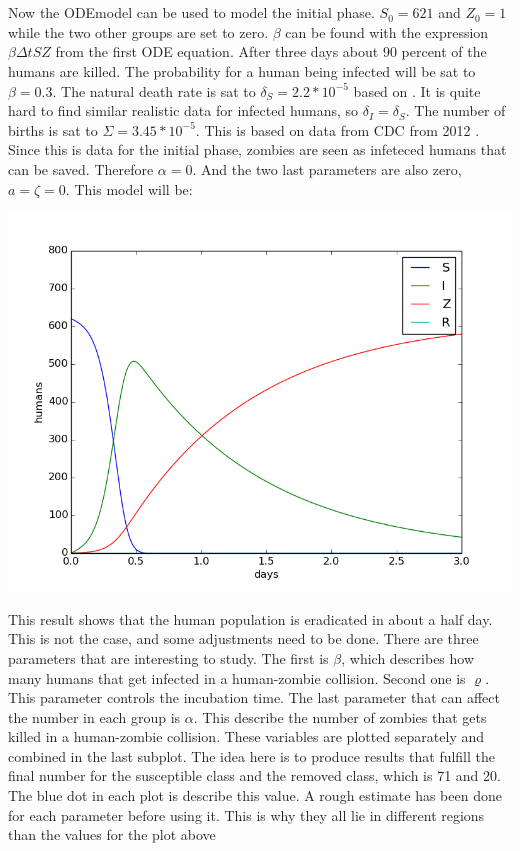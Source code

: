 \documentclass[%
twoside,                 %
final,                   %
10pt]{article}
\begin{document}
\\
\\
Now the ODEmodel can be used to model the initial phase. $S_0 = 621$ and $Z_0 = 1$ while the two other groups are set to zero. $\beta$ can be found with the expression $\beta \Delta t S Z$ from the first ODE equation. After three days about 90 percent of the humans are killed. The probability for a human being infected will be sat to $\beta = 0.3$. The natural death rate is sat to $\delta_S = 2.2*10^{-5}$ based on \cite{CBC_deaths_2011}. It is quite hard to find similar realistic data for infected humans, so $\delta_I = \delta_S$. The number of births is sat to $\Sigma = 3.45*10^{-5}$. This is based on data from CDC from 2012 \cite{CBC_births_2012}. Since this is data for the initial phase, zombies are seen as infeteced humans that can be saved. Therefore $\alpha = 0$. And the two last parameters are also zero, $a = \zeta = 0$. This model will be:


\begin{center}  %
  \centerline{\includegraphics[width=0.9\linewidth]{plots/WD_zombie_initial_1.png}}
\end{center}


This result shows that the human population is eradicated in about a half day. This is not the case, and some adjustments need to be done. There are three parameters that are interesting to study. The first is $\beta$, which describes how many humans that get infected in a human-zombie collision. Second one is $\varrho$. This parameter controls the incubation time. The last parameter that can affect the number in each group is $\alpha$. This describe the number of zombies that gets killed in a human-zombie collision. These variables are plotted separately and combined in the last subplot. The idea here is to produce results that fulfill the final number for the susceptible class and the removed class, which is 71 and 20. The blue dot in each plot is describe this value. A rough estimate has been done for each parameter before using it. This is why they all lie in different regions than the values for the plot above
\end{document}
